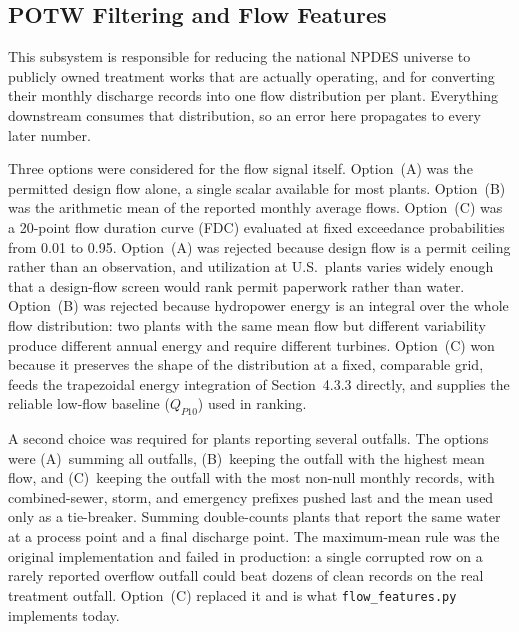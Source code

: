 \documentclass[12pt,letterpaper]{report}
\begin{document}
\subsection{POTW Filtering and Flow Features}

This subsystem is responsible for reducing the national NPDES universe to
publicly owned treatment works that are actually operating, and for converting
their monthly discharge records into one flow distribution per plant. Everything
downstream consumes that distribution, so an error here propagates to every
later number.

Three options were considered for the flow signal itself. Option~(A) was the
permitted design flow alone, a single scalar available for most plants.
Option~(B) was the arithmetic mean of the reported monthly average flows.
Option~(C) was a 20-point flow duration curve (FDC) evaluated at fixed
exceedance probabilities from 0.01 to 0.95. Option~(A) was rejected because
design flow is a permit ceiling rather than an observation, and utilization at
U.S.\ plants varies widely enough that a design-flow screen would rank permit
paperwork rather than water. Option~(B) was rejected because hydropower energy
is an integral over the whole flow distribution: two plants with the same mean
flow but different variability produce different annual energy and require
different turbines. Option~(C) won because it preserves the shape of the
distribution at a fixed, comparable grid, feeds the trapezoidal energy
integration of Section~4.3.3 directly, and supplies the reliable low-flow
baseline ($Q_{P10}$) used in ranking.

A second choice was required for plants reporting several outfalls. The options
were (A)~summing all outfalls, (B)~keeping the outfall with the highest mean
flow, and (C)~keeping the outfall with the most non-null monthly records, with
combined-sewer, storm, and emergency prefixes pushed last and the mean used only
as a tie-breaker. Summing double-counts plants that report the same water at a
process point and a final discharge point. The maximum-mean rule was the
original implementation and failed in production: a single corrupted row on a
rarely reported overflow outfall could beat dozens of clean records on the real
treatment outfall. Option~(C) replaced it and is what \texttt{flow\_features.py}
implements today.
\end{document}
